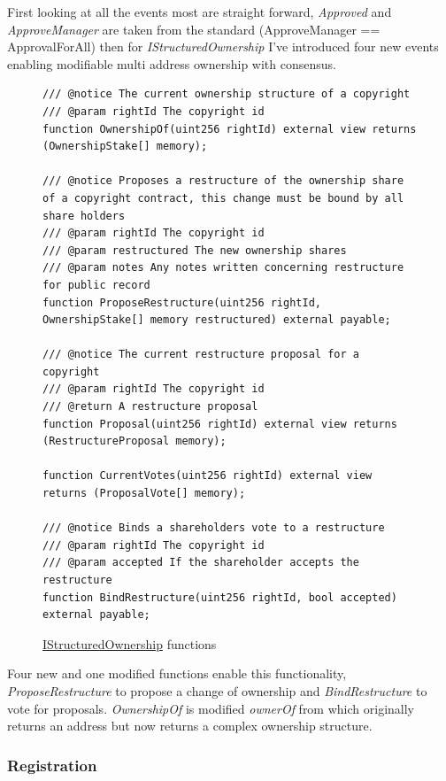 First looking at all the events most are straight forward, \textit{Approved} and \textit{ApproveManager} are taken from the \nft standard (ApproveManager == ApprovalForAll) then for \textit{IStructuredOwnership} I've introduced four new events enabling modifiable multi address ownership with consensus.

\begin{figure}[H]
\caption{\href{https://github.com/MrHarrisonBarker/CRPL/blob/main/CRPL.Contracts/contracts/IStructuredOwnership.sol}{IStructuredOwnership} functions}
\centering
\begin{lstlisting}[language=Solidity]
/// @notice The current ownership structure of a copyright
/// @param rightId The copyright id
function OwnershipOf(uint256 rightId) external view returns (OwnershipStake[] memory);

/// @notice Proposes a restructure of the ownership share of a copyright contract, this change must be bound by all share holders
/// @param rightId The copyright id
/// @param restructured The new ownership shares
/// @param notes Any notes written concerning restructure for public record
function ProposeRestructure(uint256 rightId, OwnershipStake[] memory restructured) external payable;

/// @notice The current restructure proposal for a copyright
/// @param rightId The copyright id
/// @return A restructure proposal
function Proposal(uint256 rightId) external view returns (RestructureProposal memory);
    
function CurrentVotes(uint256 rightId) external view returns (ProposalVote[] memory);

/// @notice Binds a shareholders vote to a restructure
/// @param rightId The copyright id
/// @param accepted If the shareholder accepts the restructure
function BindRestructure(uint256 rightId, bool accepted) external payable;
\end{lstlisting}
\end{figure}

Four new and one modified functions enable this functionality, \textit{ProposeRestructure} to propose a change of ownership and \textit{BindRestructure} to vote for proposals. \textit{OwnershipOf} is modified \textit{ownerOf} from \nft which originally returns an address but now returns a complex ownership structure.

\subsubsection{Registration}

